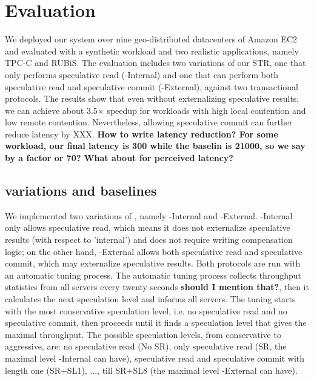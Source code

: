 
\section{Evaluation}
\label{sec:evaluation}
We deployed our system over nine geo-distributed datacenters of Amazon EC2 and evaluated with a synthetic workload and two realistic applications, namely TPC-C and RUBiS. The evaluation includes two variations of our STR, one that only performs speculative read ({\specula}-Internal) and one that can perform both speculative read and speculative commit ({\specula}-External), against two transactional protocols. The results show that even without externalizing speculative results, we can achieve about 3.5$\times$ speedup for workloads with high local contention and low remote contention. Nevertheless, allowing speculative commit can further reduce latency by XXX. \textbf{How to write latency reduction? For some workload, our final latency is 300 while the baselin is 21000, so we say by a factor or 70? What about for perceived latency?}

\subsection{\specula variations and baselines}
We implemented two variations of \specula, namely {\specula}-Internal and  {\specula}-External. {\specula}-Internal only allows speculative read, which means it does not externalize speculative results (with respect to 'internal') and does not require writing compensation logic; on the other hand, {\specula}-External allows both speculative read and speculative commit, which may externalize speculative results. Both protocols are run with an automatic tuning process. The automatic tuning process collects throughput statistics from all servers every twenty seconds \textbf{should I mention that?}, then it calculates the next speculation level and informs all servers. The tuning starts with the most conservative speculation level, i.e. no speculative read and no speculative commit, then proceeds until it finds a speculation level that gives the maximal throughput. The possible speculation levels, from conservative to aggressive, are: no speculative read (No SR), only speculative read (SR, the maximal level {\specula}-Internal can have), speculative read and speculative commit with length one (SR+SL1), ..., till SR+SL8 (the maximal level {\specula}-External can have).


